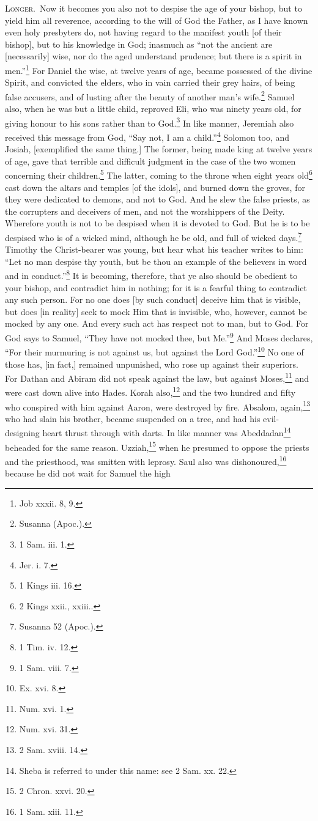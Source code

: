 \textsc{Longer.}~Now it becomes you also not to despise the age of your bishop, but to yield him all reverence, according to the will of God the Father, as I have known even holy presbyters do, not having regard to the manifest youth [of their bishop], but to his knowledge in God; inasmuch as “not the ancient are [necessarily] wise, nor do the aged understand prudence; but there is a spirit in men.”\footnote{Job xxxii. 8, 9.} For Daniel the wise, at twelve years of age, became possessed of the divine Spirit, and convicted the elders, who in vain carried their grey hairs, of being false accusers, and of lusting after the beauty of another man’s wife.\footnote{Susanna (Apoc.).} Samuel also, when he was but a little child, reproved Eli, who was ninety years old, for giving honour to his sons rather than to God.\footnote{1 Sam. iii. 1.} In like manner, Jeremiah also received this message from God, “Say not, I am a child.”\footnote{Jer. i. 7.} Solomon too, and Josiah, [exemplified the same thing.] The former, being made king at twelve years of age, gave that terrible and difficult judgment in the case of the two women concerning their children.\footnote{1 Kings iii. 16.} The latter, coming to the throne when eight years old\footnote{2 Kings xxii., xxiii..} cast down the altars and temples [of the idols], and burned down the groves, for they were dedicated to demons, and not to God. And he slew the false priests, as the corrupters and deceivers of men, and not the worshippers of the Deity. Wherefore youth is not to be despised when it is devoted to God. But he is to be despised who is of a wicked mind, although he be old, and full of wicked days.\footnote{Susanna 52 (Apoc.).} Timothy the Christ-bearer was young, but hear what his teacher writes to him: “Let no man despise thy youth, but be thou an example of the believers in word and in conduct.”\footnote{1 Tim. iv. 12.} It is becoming, therefore, that ye also should be obedient to your bishop, and contradict him in nothing; for it is a fearful thing to contradict any such person. For no one does [by such conduct] deceive him that is visible, but does [in reality] seek to mock Him that is invisible, who, however, cannot be mocked by any one. And every such act has respect not to man, but to God. For God says to Samuel, “They have not mocked thee, but Me.”\footnote{1 Sam. viii. 7.} And Moses declares, “For their murmuring is not against us, but against the Lord God.”\footnote{Ex. xvi. 8.} No one of those has, [in fact,] remained unpunished, who rose up against their superiors. For Dathan and Abiram did not speak against the law, but against Moses,\footnote{Num. xvi. 1.} and were cast down alive into Hades. Korah also,\footnote{Num. xvi. 31.} and the two hundred and fifty who conspired with him against Aaron, were destroyed by fire. Absalom, again,\footnote{2 Sam. xviii. 14.} who had slain his brother, became suspended on a tree, and had his evil-designing heart thrust through with darts. In like manner was Abeddadan\footnote{Sheba is referred to under this name: see 2 Sam. xx. 22.} beheaded for the same reason. Uzziah,\footnote{2 Chron. xxvi. 20.} when he presumed to oppose the priests and the priesthood, was smitten with leprosy. Saul also was dishonoured,\footnote{1 Sam. xiii. 11.} because he did not wait for Samuel the high 